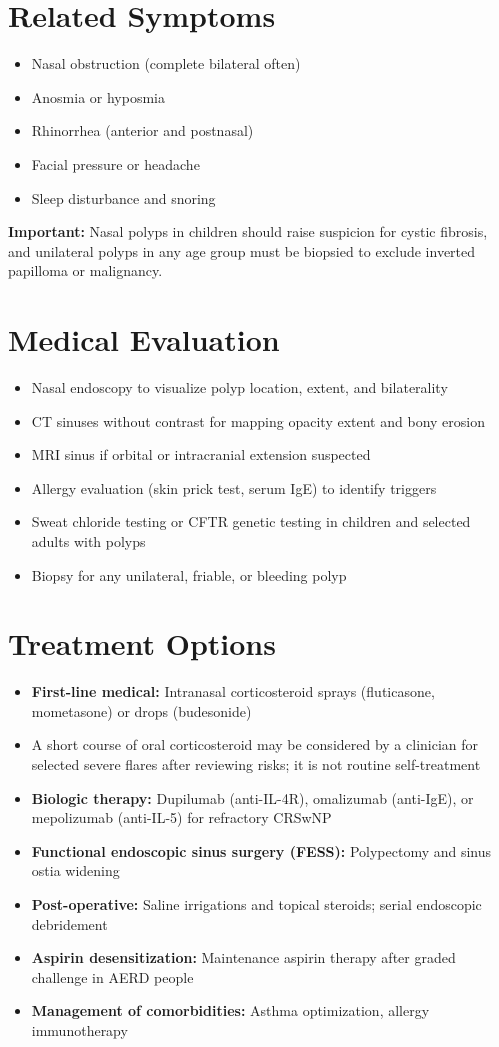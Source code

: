 \section*{Related Symptoms}
\begin{itemize}
  \item Nasal obstruction (complete bilateral often)
  \item Anosmia or hyposmia
  \item Rhinorrhea (anterior and postnasal)
  \item Facial pressure or headache
  \item Sleep disturbance and snoring
\end{itemize}
\textbf{Important:} Nasal polyps in children should raise suspicion for cystic fibrosis, and unilateral polyps in any age group must be biopsied to exclude inverted papilloma or malignancy.

\section*{Medical Evaluation}
\begin{itemize}
  \item Nasal endoscopy to visualize polyp location, extent, and bilaterality
  \item CT sinuses without contrast for mapping opacity extent and bony erosion
  \item MRI sinus if orbital or intracranial extension suspected
  \item Allergy evaluation (skin prick test, serum IgE) to identify triggers
  \item Sweat chloride testing or CFTR genetic testing in children and selected adults with polyps
  \item Biopsy for any unilateral, friable, or bleeding polyp
\end{itemize}

\section*{Treatment Options}
\begin{itemize}
  \item \textbf{First-line medical:} Intranasal corticosteroid sprays (fluticasone, mometasone) or drops (budesonide)
  \item A short course of oral corticosteroid may be considered by a clinician for selected severe flares after reviewing risks; it is not routine self-treatment
  \item \textbf{Biologic therapy:} Dupilumab (anti-IL-4R), omalizumab (anti-IgE), or mepolizumab (anti-IL-5) for refractory CRSwNP
  \item \textbf{Functional endoscopic sinus surgery (FESS):} Polypectomy and sinus ostia widening
  \item \textbf{Post-operative:} Saline irrigations and topical steroids; serial endoscopic debridement
  \item \textbf{Aspirin desensitization:} Maintenance aspirin therapy after graded challenge in AERD people
  \item \textbf{Management of comorbidities:} Asthma optimization, allergy immunotherapy
\end{itemize}

